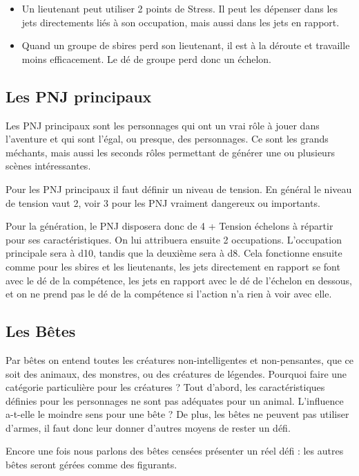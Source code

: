 \begin{multicols}{2}
\begin{itemize}
\item Un lieutenant peut utiliser 2 points de Stress. Il peut les dépenser dans les jets directements liés à son occupation, mais aussi dans les jets en rapport.
\item Quand un groupe de sbires perd son lieutenant, il est à la déroute et travaille moins efficacement. Le dé de groupe perd donc un échelon.
\end{itemize}

\subsection{Les PNJ principaux}

Les PNJ principaux sont les personnages qui ont un vrai rôle à jouer dans l'aventure et qui sont l'égal, ou presque, des personnages. Ce sont les grands méchants, mais aussi les seconds rôles permettant de générer une ou plusieurs scènes intéressantes.

Pour les PNJ principaux il faut définir un niveau de tension. En général le niveau de tension vaut 2, voir 3 pour les PNJ vraiment dangereux ou importants. 

Pour la génération, le PNJ disposera donc de 4 + Tension échelons à répartir pour ses caractéristiques. On lui attribuera ensuite 2 occupations. L'occupation principale sera à d10, tandis que la deuxième sera à d8. Cela fonctionne ensuite comme pour les sbires et les lieutenants, les jets directement en rapport se font avec le dé de la compétence, les jets en rapport avec le dé de l'échelon en dessous, et on ne prend pas le dé de la compétence si l'action n'a rien à voir avec elle.

\subsection{Les Bêtes}

Par bêtes on entend toutes les créatures non-intelligentes et non-pensantes, que ce soit des animaux, des monstres, ou des créatures de légendes. Pourquoi faire une catégorie particulière pour les créatures ? Tout d'abord, les caractéristiques définies pour les personnages ne sont pas adéquates pour un animal. L'influence a-t-elle le moindre sens pour une bête ? De plus, les bêtes ne peuvent pas utiliser d'armes, il faut donc leur donner d'autres moyens de rester un défi.

Encore une fois nous parlons des bêtes censées présenter un réel défi : les autres bêtes seront gérées comme des figurants. 


\end{multicols}
